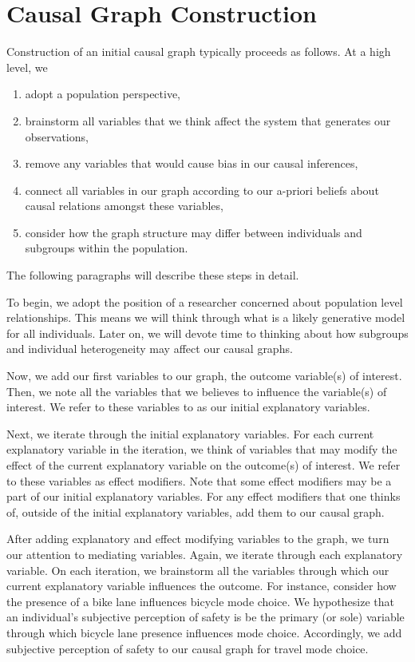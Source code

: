 \section{Causal Graph Construction}

Construction of an initial causal graph typically proceeds as follows.
At a high level, we
\begin{enumerate}
   \item adopt a population perspective,
   \item brainstorm all variables that we think affect the system that generates our observations,
   \item remove any variables that would cause bias in our causal inferences,
   \item connect all variables in our graph according to our a-priori beliefs about causal relations amongst these variables,
   \item consider how the graph structure may differ between individuals and subgroups within the population.
\end{enumerate}
The following paragraphs will describe these steps in detail.

To begin, we adopt the position of a researcher concerned about population level relationships.
This means we will think through what is a likely generative model for all individuals.
Later on, we will devote time to thinking about how subgroups and individual heterogeneity may affect our causal graphs.

Now, we add our first variables to our graph, the outcome variable(s) of interest.
Then, we note all the variables that we believes to influence the variable(s) of interest.
We refer to these variables to as our initial explanatory variables.

Next, we iterate through the initial explanatory variables.
For each current explanatory variable in the iteration, we think of variables that may modify the effect of the current explanatory variable on the outcome(s) of interest.
We refer to these variables as effect modifiers.
Note that some effect modifiers may be a part of our initial explanatory variables.
For any effect modifiers that one thinks of, outside of the initial explanatory variables, add them to our causal graph.

After adding explanatory and effect modifying variables to the graph, we turn our attention to mediating variables.
Again, we iterate through each explanatory variable.
On each iteration, we brainstorm all the variables through which our current explanatory variable influences the outcome.
For instance, consider how the presence of a bike lane influences bicycle mode choice.
We hypothesize that an individual's subjective perception of safety is be the primary (or sole) variable through which bicycle lane presence influences mode choice.
Accordingly, we add subjective perception of safety to our causal graph for travel mode choice.

